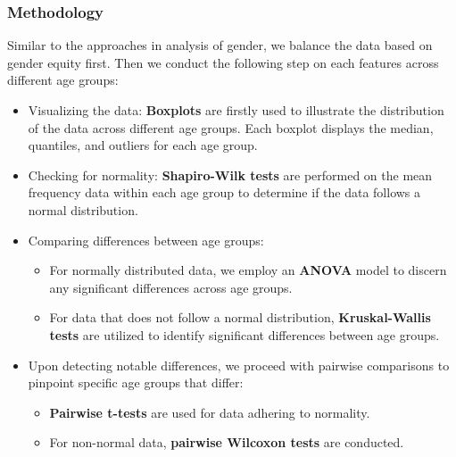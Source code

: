 \documentclass{article}
\begin{document}
	\subsubsection{Methodology}
	Similar to the approaches in analysis of gender, we balance the data based on gender equity first. Then we conduct the following step on each features across different age groups:
	\begin{itemize}
		\item Visualizing the data: \textbf{Boxplots} are firstly used to illustrate the distribution of the data across different age groups. Each boxplot displays the median, quantiles, and outliers for each age group.
		\item Checking for normality: \textbf{Shapiro-Wilk tests} are performed on the mean frequency data within each age group to determine if the data follows a normal distribution.
		\item Comparing differences between age groups:
		\begin{itemize}
			\item For normally distributed data, we employ an \textbf{ANOVA} model to discern any significant differences across age groups.
			\item For data that does not follow a normal distribution, \textbf{Kruskal-Wallis tests} are utilized to identify significant differences between age groups.
		\end{itemize}
		\item Upon detecting notable differences, we proceed with pairwise comparisons to pinpoint specific age groups that differ:
		\begin{itemize}
			\item \textbf{Pairwise t-tests} are used for data adhering to normality.
			\item For non-normal data, \textbf{pairwise Wilcoxon tests} are conducted.
		\end{itemize}
	\end{itemize}
	
\end{document}
